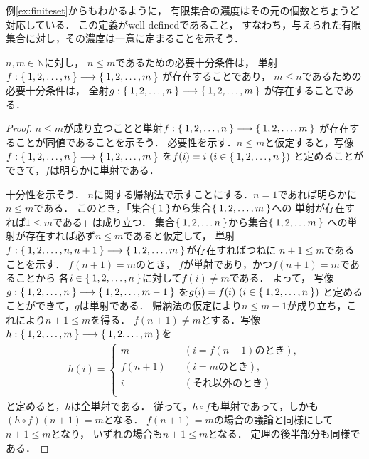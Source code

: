    例\ref{ex:finiteset}からもわかるように，
   有限集合の濃度はその元の個数とちょうど対応している．
   この定義がwell-definedであること，
   すなわち，与えられた有限集合に対し，その濃度は一意に定まることを示そう．

   \begin{thm} \label{thm:yugeninjsurj} 
     $n,  m \in \mathbb{N}$に対し，
     $n \leq m$であるための必要十分条件は，
     単射$f: \Set{ 1,  2,  \ldots ,  n } \longrightarrow \Set{ 1,  2,  \ldots ,  m}$
     が存在することであり，
     $m \leq n$であるための必要十分条件は，
     全射$g: \Set{ 1,  2,  \ldots ,  n} \longrightarrow \Set{ 1,  2,  \ldots ,  m}$
     が存在することである．
   \end{thm}
   \begin{proof}
     $n \leq m$が成り立つことと単射$f: \Set{ 1,  2,  \ldots ,  n }
     \longrightarrow \Set{ 1,  2,  \ldots ,  m}$
     が存在することが同値であることを示そう．
     必要性を示す．$n \leq m$と仮定すると，写像
     $f: \Set{ 1,  2,  \ldots ,  n} \longrightarrow \Set{ 1,  2,  \ldots ,  m}$
     を$f(i) = i \ ( i \in \Set{1,  2,  \ldots ,  n})$
     と定めることができて，$f$は明らかに単射である．
     
     十分性を示そう．
     $n$に関する帰納法で示すことにする．$n=1$であれば明らかに$n \leq m$である．
     このとき，「集合$\Set{ 1}$から集合$\Set{ 1,2, \ldots , m}$への
     単射が存在すれば$1 \leq m$である」は成り立つ．
     集合$\Set{ 1,  2,  \ldots n}$から集合$\Set{ 1,  2,  \ldots m}$
     への単射が存在すれば必ず$n \leq m$であると仮定して，
     単射$f: \Set{ 1,  2,  \ldots ,  n ,  n+1} 
     \longrightarrow \Set{ 1,  2,  \ldots ,  m}$が存在すればつねに
     $n+1 \leq m$であることを示す．
     $f(n+1) = m$のとき，
     $f$が単射であり，かつ$f(n+1)=m$であることから
     各$i \in \Set{ 1,  2,  \ldots ,  n}$に対して$f(i) \neq m$である．
     よって，
     写像$g: \Set{ 1,  2,  \ldots ,  n} \longrightarrow \Set{ 1,  2,  \ldots ,  m-1}$
     を$g(i) = f(i ) \ ( i \in \Set{ 1,  2,  \ldots ,  n})$
     と定めることができて，$g$は単射である．
     帰納法の仮定により$n \leq m-1$が成り立ち，これにより$n+1 \leq m$を得る．
     $f(n+1) \neq m$とする．写像$h : \Set{ 1,  2,  \ldots ,  m} 
     \longrightarrow \Set{ 1,  2,  \ldots ,  m}$を
     \begin{align*}
       h(i ) = \left \{
         \begin{aligned} 
           m  \qquad \;  &  ( i= f(n+1) \text{のとき} ) , \\
           f(n+1)  \quad &  (i=m \text{のとき}) , \\
           i  \qquad \; &  ( \text{それ以外のとき} ) \\ 
         \end{aligned}
         \right.
     \end{align*}
     と定めると，$h$は全単射である．
     従って，$h \circ f$も単射であって，しかも$(h \circ f) (n+1) = m$となる．
     $f(n+1)=m$の場合の議論と同様にして$n+1 \leq m$となり，
     いずれの場合も$n+1 \leq m$となる．
     定理の後半部分も同様である．
   \end{proof}

